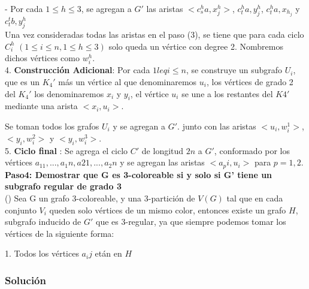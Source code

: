 \documentclass[
10pt, %
a4paper, %
oneside, %
headinclude,footinclude, %
BCOR5mm, %
]{scrartcl}
\begin{document}
- Por cada $1\leq h \leq 3$, se agregan a $G'$ las aristas $<c^h_sa,x^h_j>$, $c^h_ta,y^h_j$, $c^h_ta,x_h_j$ y $c^t_tb, y^h_j$\\

Una vez consideradas todas las aristas en
el paso (3), se tiene que para cada ciclo $C^h_i$ $( 1\leq i \leq n, 1 \leq h \leq 3 )$ solo queda un vértice con degree 2. Nombremos
dichos vértices como $w^h_i$.\\

4. \textbf{Construcción Adicional}: Por cada $1 leq i \leq n$, se construye un subgrafo $U_i$, que es un $K_4'$ más un vértice al que denominaremos $u_i$, los vértices de grado 2 del $K_4'$ los denominaremos 
$x_i$ y $y_i$, el vértice $u_i$ se une a los restantes del $K4'$ mediante una arista $<x_i, u_i>$. 

Se toman todos los grafos $U_i$ y se agregan a $G'$. junto con las aristas $<u_i,w^1_i>$, $<y_i, w^2_i>$ y $<y_i, w^3_i>$.\\


5. \textbf{Ciclo final} : Se agrega el ciclo $C'$ de longitud $2n$ a $G'$, conformado por los vértices ${a_11,..., a_1n, a21,..., a_2n}$ y se agregan las aristas $<a_pi, u_i>$ para $p = 1,2$.\\


\textbf{Paso4: Demostrar que G es 3-coloreable si y solo si G' tiene un subgrafo regular de grado 3  }\\

(\Rightarrow ) Sea G un grafo 3-coloreable, y una 3-partición de $V(G)$ tal que en cada conjunto $V_i$ queden solo vértices de un mismo color, entonces existe un grafo $H$, 
subgrafo inducido de $G'$ que es 3-regular, ya que siempre podemos tomar los vértices de la siguiente forma:

1. Todos los vértices $a_ij$ etán en $H$







\subsubsection{Solución}




\renewcommand{\refname}{\spacedlowsmallcaps{References}} %




\end{document}
